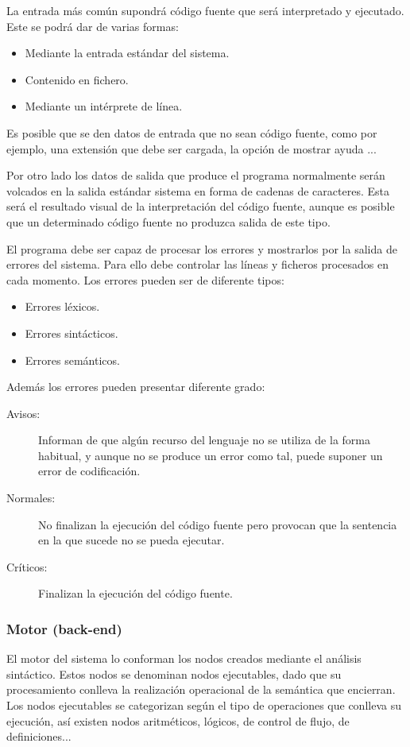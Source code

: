 La entrada más común supondrá código fuente que será interpretado y ejecutado. Este se podrá dar de varias formas:

\begin{itemize}
\item Mediante la entrada estándar del sistema.
\item Contenido en fichero.
\item Mediante un intérprete de línea.
\end{itemize}

Es posible que se den datos de entrada que no sean código fuente, como por ejemplo, una extensión que debe ser cargada, la opción de mostrar ayuda ...

Por otro lado los datos de salida que produce el programa normalmente serán volcados en la salida estándar sistema en forma de cadenas de caracteres. 
Esta será el resultado visual de la interpretación del código fuente, aunque es posible que un determinado código fuente no produzca salida de este tipo. 

El programa debe ser capaz de procesar los errores y mostrarlos por la salida de errores del sistema. Para ello debe controlar las líneas y ficheros procesados en cada
momento. Los errores pueden ser de diferente tipos:

\begin{itemize}
\item Errores léxicos.
\item Errores sintácticos.
\item Errores semánticos.
\end{itemize}

Además los errores pueden presentar diferente grado:

\begin{description}
\item [Avisos:] Informan de que algún recurso del lenguaje no se utiliza de la forma habitual, y aunque no se produce un error como tal, puede suponer un error de codificación.
\item [Normales:] No finalizan la ejecución del código fuente pero provocan que la sentencia en la que sucede no se pueda ejecutar.
\item [Críticos:] Finalizan la ejecución del código fuente.
\end{description}

\subsubsection{Motor (back-end)}
El motor del sistema lo conforman los nodos creados mediante el análisis sintáctico. Estos nodos se denominan nodos ejecutables, dado que su procesamiento conlleva la realización operacional
de la semántica que encierran. Los nodos ejecutables se categorizan según el tipo de operaciones que conlleva su ejecución, así existen nodos aritméticos, lógicos, de control de flujo, 
de definiciones... 


